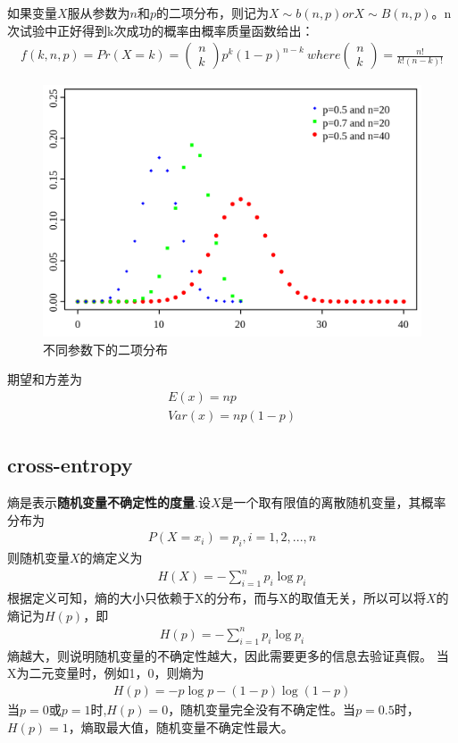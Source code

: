 \documentclass{article}
\begin{document}
如果变量$X$服从参数为$n$和$p$的二项分布，则记为$X\sim b(n,p) or X\sim B(n,p)$。n次试验中正好得到k次成功的概率由概率质量函数给出：
\begin{align}
f(k,n,p) = Pr( X = k ) = \begin{pmatrix}
n\\ 
k
\end{pmatrix} p^k (1 - p)^{n-k}
\ where
\begin{pmatrix}
n\\ 
k
\end{pmatrix} = \frac{n!}{k!(n-k)!}
\end{align}

\begin{figure}[htp]
\centering
\includegraphics[scale=0.3]{images/distribution/binomial_distribution.png}
\caption{不同参数下的二项分布}
\label{Fig.Binomial_distribution}
\end{figure}

期望和方差为
\begin{align}
E(x) = np  \\
Var(x) = np( 1-p)
\end{align}

\subsection{cross-entropy}
熵是表示\textbf{随机变量不确定性的度量}.设$X$是一个取有限值的离散随机变量，其概率分布为
\begin{align}
P(X=x_i) = p_i, i =1,2,..., n
\end{align}
则随机变量$X$的熵定义为
\begin{align}
H(X) = - \sum_{i=1}^n p_i \log{p_i}
\end{align}
根据定义可知，熵的大小只依赖于X的分布，而与X的取值无关，所以可以将$X$的熵记为$H(p)$，即
\begin{align}
H(p) = - \sum_{i=1}^n p_i \log{p_i}
\end{align}
熵越大，则说明随机变量的不确定性越大，因此需要更多的信息去验证真假。
当X为二元变量时，例如1，0，则熵为
\begin{align}
H(p) = -p\log{p} - (1-p)\log{(1-p)}
\end{align}
当$p=0$或$p=1$时,$H(p)=0$，随机变量完全没有不确定性。当$p=0.5$时，$H(p) = 1$，熵取最大值，随机变量不确定性最大。
\end{document}
